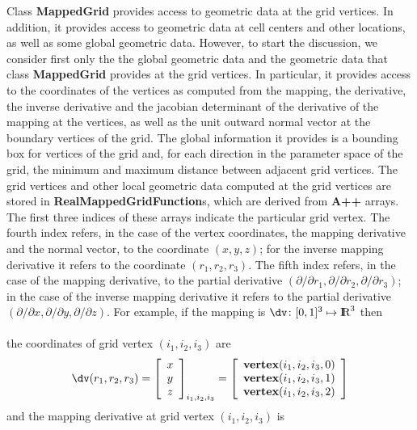 \documentclass{article}
\begin{document}
Class \textbf{MappedGrid} provides access to geometric data at the 
grid vertices.  In addition, it provides access to geometric data at cell
centers and other locations, as well as some global geometric data.  However,
to start the discussion, we consider first only the the global geometric data
and the geometric data that class \textbf{MappedGrid} provides at the grid
vertices.  In particular, it provides access to the coordinates of the
vertices as computed from the mapping, the derivative, the inverse derivative
and the jacobian determinant of the derivative of the mapping at the vertices,
as well as the unit outward normal vector at the boundary vertices of the grid.
The global information it provides is a bounding box for vertices of the grid
and, for each direction in the parameter space of the grid, the minimum and
maximum distance between adjacent grid vertices.  The grid vertices and other
local geometric data computed at the grid vertices are stored in
\textbf{RealMappedGridFunction}s, which are derived from \textbf{A++}
arrays.  The first three indices of these arrays indicate the particular
grid vertex.  The fourth index refers, in the case of the vertex coordinates,
the mapping derivative and the normal vector, to the coordinate $(x,y,z)$;
for the inverse mapping derivative it refers to the coordinate $(r_1,r_2,r_3)$.
The fifth index refers, in the case of the mapping derivative,
to the partial derivative $(\partial/\partial r_1, \partial/\partial r_2,
\partial/\partial r_3)$; in the case of the inverse mapping derivative it
refers to the partial derivative 
$(\partial/\partial x, \partial/\partial y,\partial/\partial z)$. For example, if the mapping is
$\dv\colon[0,1]^3\mapsto\mbox{I\kern-.22em R}^3$ then\hfil\\\hfil\\
the coordinates of grid vertex $(i_1,i_2,i_3)$ are
\[
    \dv(r_1,r_2,r_3) =
      \left[\begin{array}{c}x\\y\\z\\\end{array}\right]_{i_1,i_2,i_3} =
      \left[\begin{array}{c}
        \textbf{vertex}(i_1,i_2,i_3,0) \\
        \textbf{vertex}(i_1,i_2,i_3,1) \\
        \textbf{vertex}(i_1,i_2,i_3,2) \\
      \end{array}\right] 
\]
and the mapping derivative at grid vertex $(i_1,i_2,i_3)$ is
\end{document}
